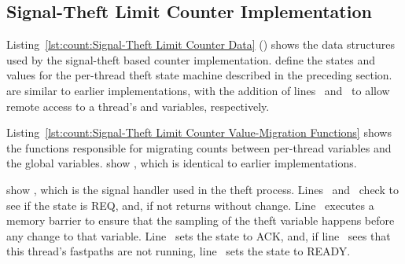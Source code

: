 \subsection{Signal-Theft Limit Counter Implementation}
\label{sec:count:Signal-Theft Limit Counter Implementation}

\begin{fcvref}
Listing~\ref{lst:count:Signal-Theft Limit Counter Data}
()
shows the data structures used by the signal-theft based counter
implementation.
 define the states and values
for the per-thread theft state machine
described in the preceding section.
 are similar to earlier implementations,
with the addition of
lines~ and~ to allow remote access to a
thread's 
and  variables, respectively.
\end{fcvref}

\begin{listing}[tbp]

\caption{Signal-Theft Limit Counter Data}
\label{lst:count:Signal-Theft Limit Counter Data}
\end{listing}

\begin{fcvref}
Listing~\ref{lst:count:Signal-Theft Limit Counter Value-Migration Functions}
shows the functions responsible for migrating counts between per-thread
variables and the global variables.
 show ,
which is identical to earlier
implementations.
\end{fcvref}
\begin{fcvref}
 show ,
which is the signal
handler used in the theft process.
Lines~ and~ check to see if
the  state is REQ, and, if not
returns without change.
Line~ executes a memory barrier to ensure that the sampling of the
theft variable happens before any change to that variable.
Line~ sets the  state to ACK, and, if
line~ sees that
this thread's fastpaths are not running, line~ sets the 
state to READY.
\end{fcvref}

\begin{listing}[tbp]

\caption{Signal-Theft Limit Counter Value-Migration Functions}
\label{lst:count:Signal-Theft Limit Counter Value-Migration Functions}
\end{listing}

